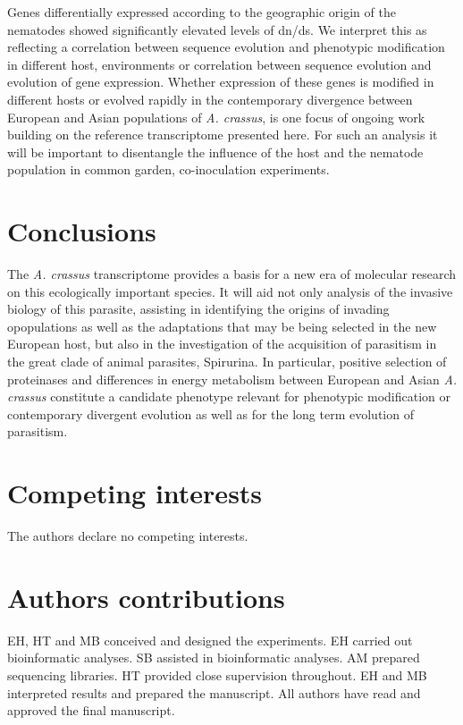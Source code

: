 \documentclass[10pt]{bmc_article}
\newenvironment{bmcformat}{\begin{raggedright}\baselineskip20pt\sloppy\setboolean{publ}{false}}{\end{raggedright}\baselineskip20pt\sloppy}
\begin{document}
\begin{bmcformat}
Genes differentially expressed according to the geographic origin of
the nematodes showed significantly elevated levels of dn/ds. We
interpret this as reflecting a correlation between sequence evolution
and phenotypic modification in different host, environments or
correlation between sequence evolution and evolution of gene
expression. Whether expression of these genes is modified in different
hosts or evolved rapidly in the contemporary divergence between
European and Asian populations of \textit{A. crassus}, is one focus of
ongoing work building on the reference transcriptome presented
here. For such an analysis it will be important to disentangle the
influence of the host and the nematode population in common garden,
co-inoculation experiments.

\section*{Conclusions }

The \textit{A. crassus} transcriptome provides a basis for a new era
of molecular research on this ecologically important species. It will
aid not only analysis of the invasive biology of this parasite,
assisting in identifying the origins of invading opopulations as well
as the adaptations that may be being selected in the new European
host, but also in the investigation of the acquisition of parasitism
in the great clade of animal parasites, Spirurina. In particular,
positive selection of proteinases and differences in energy metabolism
between European and Asian \textit{A. crassus} constitute a candidate
phenotype relevant for phenotypic modification or contemporary
divergent evolution as well as for the long term evolution of
parasitism.

\section*{Competing interests}
The authors declare no competing interests.

\section*{Authors contributions}

EH, HT and MB conceived and designed the experiments. EH carried out
bioinformatic analyses. SB assisted in bioinformatic analyses. AM
prepared sequencing libraries. HT provided close supervision
throughout. EH and MB interpreted results and prepared the
manuscript. All authors have read and approved the final manuscript.


\end{bmcformat}
\end{document}
